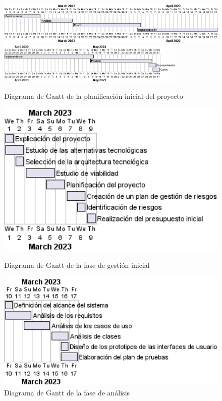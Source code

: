 
\begin{figure}[H]
	\centering
	\includegraphics[width=1\textwidth]{4-PlanificacionYGestionDelTFG/PlanificacionInicial/gant1.png}
	\includegraphics[width=0.8\textwidth]{4-PlanificacionYGestionDelTFG/PlanificacionInicial/gant2.png}
	\caption{Diagrama de Gantt de la planificación inicial del proyecto}
\end{figure}

\begin{figure}[H]
	\centering
	\begin{minipage}{0.45\textwidth}
		\includegraphics[width=1\textwidth]{4-PlanificacionYGestionDelTFG/PlanificacionInicial/gant-gestionInicial.png}
		\caption{Diagrama de Gantt de la fase de gestión inicial}
	\end{minipage}
	\hfill
	\begin{minipage}{0.45\textwidth}
		\centering
		\includegraphics[width=1\textwidth]{4-PlanificacionYGestionDelTFG/PlanificacionInicial/gant-analisis.png}
		\caption{Diagrama de Gantt de la fase de análisis}
	\end{minipage}
\end{figure}

